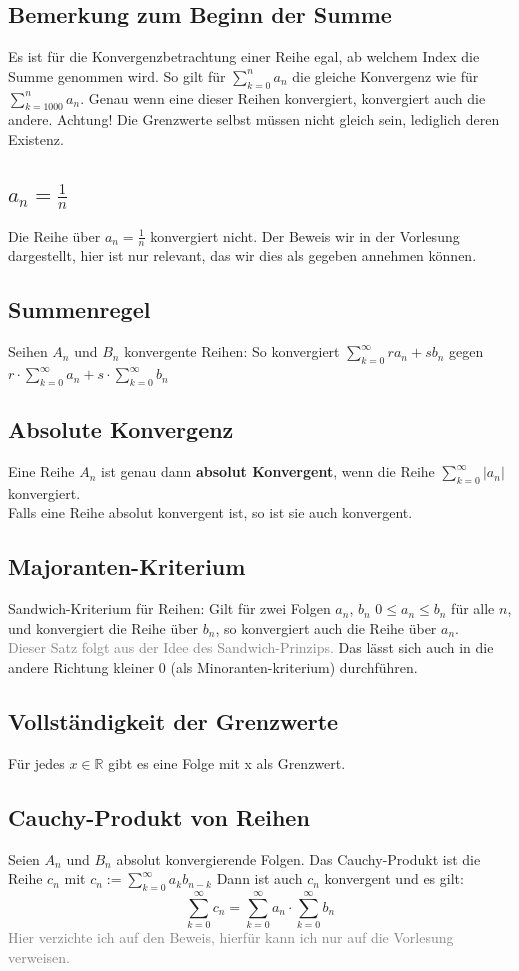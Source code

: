 \documentclass{report}
\begin{document}
		\subsection{Bemerkung zum Beginn der Summe}
		Es ist für die Konvergenzbetrachtung einer Reihe egal, ab welchem Index die Summe genommen wird. So gilt für $\sum_{k=0}^{n}a_n$ die gleiche Konvergenz wie für $\sum_{k=1000}^n a_n$. Genau wenn eine dieser Reihen konvergiert, konvergiert auch die andere. Achtung! Die Grenzwerte selbst müssen nicht gleich sein, lediglich deren Existenz.
		\subsection{$a_n = \frac1n$}
			Die Reihe über $a_n = \frac1n$ konvergiert nicht. Der Beweis wir in der Vorlesung dargestellt, hier ist nur relevant, das wir dies als gegeben annehmen können.
		\subsection{Summenregel}
			Seihen $A_n$ und $B_n$ konvergente Reihen: So konvergiert $\sum_{k=0}^{\infty} ra_n + sb_n$ gegen $r \cdot \sum_{k=0}^{\infty} a_n + s \cdot \sum_{k=0}^{\infty} b_n$
		\subsection{Absolute Konvergenz}
			Eine Reihe $A_n$ ist genau dann \textbf{absolut Konvergent}, wenn die Reihe $\sum_{k=0}^{\infty} |a_n| $ konvergiert.\\
			Falls eine Reihe absolut konvergent ist, so ist sie auch konvergent.
		\subsection{Majoranten-Kriterium}
			Sandwich-Kriterium für Reihen: Gilt für zwei Folgen $a_n$, $b_n$ $0 \leq a_n \leq b_n$ für alle $n$, und konvergiert die Reihe über $b_n$, so konvergiert auch die Reihe über $a_n$. \\
			\textcolor{gray}{Dieser Satz folgt aus der Idee des Sandwich-Prinzips.}
			Das lässt sich auch in die andere Richtung kleiner 0 (als Minoranten-kriterium) durchführen.
		\subsection{Vollständigkeit der Grenzwerte}
			Für jedes $x\in \mathbb{R} $ gibt es eine Folge mit x als Grenzwert.
		\subsection{Cauchy-Produkt von Reihen}
			Seien $A_n$ und $B_n$ absolut konvergierende Folgen. Das Cauchy-Produkt ist die Reihe $c_n$ mit $c_n := \sum_{k=0}^{\infty} a_kb_{n-k}$ Dann ist auch $c_n$ konvergent und es gilt: 
			\begin{equation}
				\displaystyle \sum_{k=0}^{\infty} c_n = \displaystyle \sum_{k=0}^{\infty} a_n \cdot \displaystyle \sum_{k=0}^{\infty} b_n 
			\end{equation}
			\textcolor{gray}{Hier verzichte ich auf den Beweis, hierfür kann ich nur auf die Vorlesung verweisen. }
\end{document}
